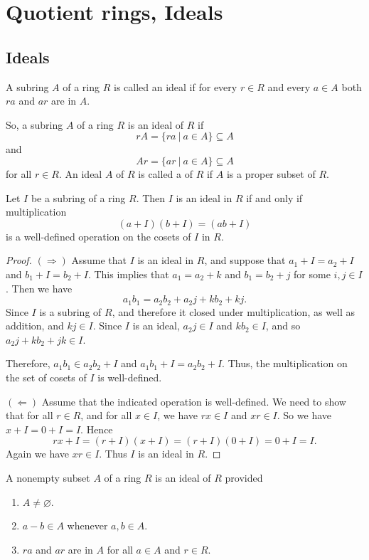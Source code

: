 \section{Quotient rings, Ideals}

\subsection{Ideals}

\begin{definition}[Ideals]
    A subring $A$ of a ring $R$ is called an ideal if for every $r \in R$ and every $a \in A$ both $ra$ and 
    $ar$ are in $A$.
\end{definition}

So, a subring $A$ of a ring $R$ is an ideal of $R$ if 
\[
   rA = \{ ra \> | \> a \in A \} \subseteq A
\]
and 
\[
    Ar = \{ ar \> | \> a \in A \} \subseteq A
\]
for all $r \in R$. An ideal $A$ of $R$ is called a  of $R$ if $A$ is a proper subset of $R$.

\begin{lemma}
    Let $I$ be a subring of a ring $R$. Then $I$ is an ideal in $R$ if and only if multiplication 
    \[
        (a + I)(b + I) = (ab + I)
    \]
    is a well-defined operation on the cosets of $I$ in $R$.
\end{lemma}
\begin{proof}
    $(\Rightarrow)$ Assume that $I$ is an ideal in $R$, and suppose 
    that $a_1 + I = a_2 + I$ and $b_1 + I = b_2 + I$. This implies that $a_1 = a_2 + k$ and 
    $b_1 = b_2 + j$ for some $i, j \in I$. Then we have 
    \[
        a_1 b_1 = a_2 b_2 + a_2 j + kb_2 + kj.
    \]
    Since $I$ is a subring of $R$, and therefore it closed under multiplication, as well as addition, and $kj \in I$. 
    Since $I$ is an ideal, $a_2 j \in I$ and $kb_2 \in I$, and so $a_2 j + kb_2 + jk \in I$. 

    Therefore, $a_1b_1 \in a_2b_2 + I$ and $a_1b_1 + I = a_2b_2 + I$. Thus, the multiplication on the set 
    of cosets of $I$ is well-defined.

    $(\Leftarrow)$ Assume that the indicated operation is well-defined. We need to show that for all $r \in R$, and 
    for all $x \in I$, we have $rx \in I$ and $xr \in I$. So we have $x + I = 0 + I = I$. Hence 
    \[
        rx + I = (r + I)(x + I) = (r + I)(0 + I) = 0 + I = I.
    \]
    Again we have $xr \in I$. Thus $I$ is an ideal in $R$.
\end{proof}

\begin{theorem}
    A nonempty subset $A$ of a ring $R$ is an ideal of $R$ provided
    \begin{enumerate}
        \item $A \neq \varnothing$.
        \item $a - b \in A$ whenever $a, b \in A$.
        \item $ra$ and $ar$ are in $A$ for all $a \in A$ and $r \in R$.
    \end{enumerate}
\end{theorem}


